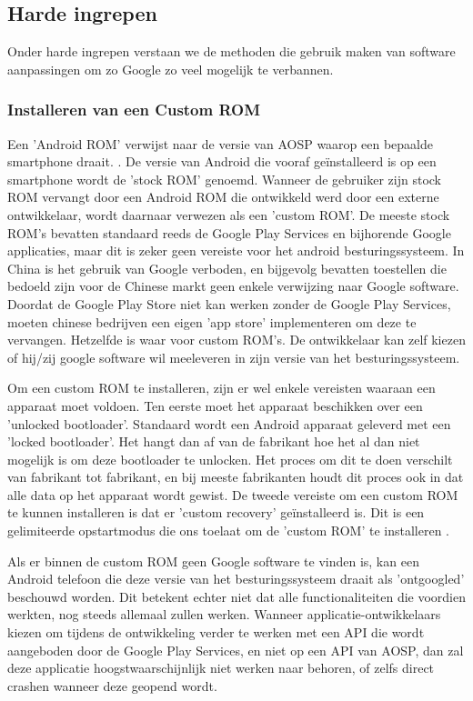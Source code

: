\subsection{Harde ingrepen}

Onder harde ingrepen verstaan we de methoden die gebruik maken van software aanpassingen om zo Google zo veel mogelijk te verbannen.

\subsubsection{Installeren van een Custom ROM}
\label{installcustomrom}
Een 'Android ROM' verwijst naar de versie van AOSP waarop een bepaalde smartphone draait. \autocite{custom-rom}. De versie van Android die vooraf geïnstalleerd is op een smartphone wordt de 'stock ROM' genoemd. Wanneer de gebruiker zijn stock ROM vervangt door een Android ROM die ontwikkeld werd door een externe ontwikkelaar, wordt daarnaar verwezen als een 'custom ROM'. De meeste stock ROM's bevatten standaard reeds de Google Play Services en bijhorende Google applicaties, maar dit is zeker geen vereiste voor het android besturingssysteem. In China is het gebruik van Google verboden, en bijgevolg bevatten toestellen die bedoeld zijn voor de Chinese markt geen enkele verwijzing naar Google software. Doordat de Google Play Store niet kan werken zonder de Google Play Services, moeten chinese bedrijven een eigen 'app store' implementeren om deze te vervangen. Hetzelfde is waar voor custom ROM's. De ontwikkelaar kan zelf kiezen of hij/zij google software wil meeleveren in zijn versie van het besturingssysteem.

Om een custom ROM te installeren, zijn er wel enkele vereisten waaraan een apparaat moet voldoen. Ten eerste moet het apparaat beschikken over een 'unlocked bootloader'. Standaard wordt een Android apparaat geleverd met een 'locked bootloader'. Het hangt dan af van de fabrikant hoe het al dan niet mogelijk is om deze bootloader te unlocken. Het proces om dit te doen verschilt van fabrikant tot fabrikant, en bij meeste fabrikanten houdt dit proces ook in dat alle data op het apparaat wordt gewist. De tweede vereiste om een custom ROM te kunnen installeren is dat er 'custom recovery' geïnstalleerd is. Dit is een gelimiteerde opstartmodus die ons toelaat om de 'custom ROM' te installeren \autocite{hoffman_custom-recovery}.

Als er binnen de custom ROM geen Google software te vinden is, kan een Android telefoon die deze versie van het besturingssysteem draait als 'ontgoogled' beschouwd worden. Dit betekent echter niet dat alle functionaliteiten die voordien werkten, nog steeds allemaal zullen werken. Wanneer applicatie-ontwikkelaars kiezen om tijdens de ontwikkeling verder te werken met een API die wordt aangeboden door de Google Play Services, en niet op een API van AOSP, dan zal deze applicatie hoogstwaarschijnlijk niet werken naar behoren, of zelfs direct crashen wanneer deze geopend wordt.


